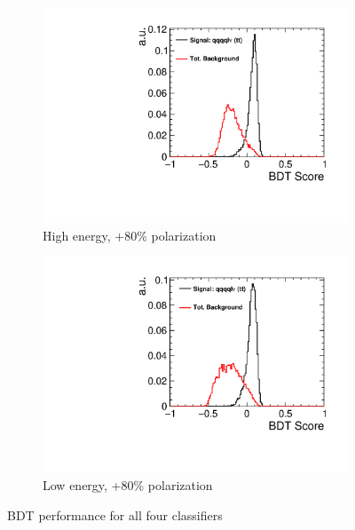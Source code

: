 \begin{figure}[ht]\ContinuedFloat 
  \begin{subfigure}[b]{0.5\linewidth}
    \centering
    \includegraphics[width=0.75\linewidth]{TopAnalysis/figures/BDTScoreHighEPos.pdf} 
    \caption{High energy, +80\% polarization} 
    \vspace{4ex}
  \end{subfigure}%
  \begin{subfigure}[b]{0.5\linewidth}
    \centering
    \includegraphics[width=0.75\linewidth]{TopAnalysis/figures/BDTScoreLowEPos.pdf} 
    \caption{Low energy, +80\% polarization} 
    \vspace{4ex}
  \end{subfigure}
  \caption{\ac{BDT} performance for all four classifiers}
  \label{fig:topbdtscores}
\end{figure}

